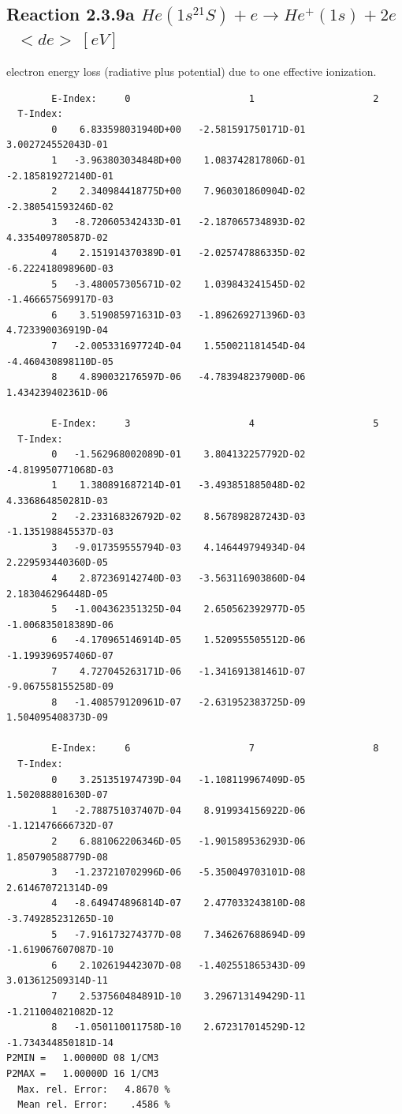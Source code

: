 \documentclass[12pt,dvipdfmx]{article}
\begin{document}
\subsection{
  Reaction 2.3.9a  $He(1s^21S) + e \rightarrow He^+(1s) + 2e $  \ $ <de> \ [eV] $
}

  electron energy loss (radiative plus potential) due to one effective ionization.

\begin{small}\begin{verbatim}
        E-Index:     0                     1                     2
  T-Index:
        0    6.833598031940D+00   -2.581591750171D-01    3.002724552043D-01
        1   -3.963803034848D+00    1.083742817806D-01   -2.185819272140D-01
        2    2.340984418775D+00    7.960301860904D-02   -2.380541593246D-02
        3   -8.720605342433D-01   -2.187065734893D-02    4.335409780587D-02
        4    2.151914370389D-01   -2.025747886335D-02   -6.222418098960D-03
        5   -3.480057305671D-02    1.039843241545D-02   -1.466657569917D-03
        6    3.519085971631D-03   -1.896269271396D-03    4.723390036919D-04
        7   -2.005331697724D-04    1.550021181454D-04   -4.460430898110D-05
        8    4.890032176597D-06   -4.783948237900D-06    1.434239402361D-06

        E-Index:     3                     4                     5
  T-Index:
        0   -1.562968002089D-01    3.804132257792D-02   -4.819950771068D-03
        1    1.380891687214D-01   -3.493851885048D-02    4.336864850281D-03
        2   -2.233168326792D-02    8.567898287243D-03   -1.135198845537D-03
        3   -9.017359555794D-03    4.146449794934D-04    2.229593440360D-05
        4    2.872369142740D-03   -3.563116903860D-04    2.183046296448D-05
        5   -1.004362351325D-04    2.650562392977D-05   -1.006835018389D-06
        6   -4.170965146914D-05    1.520955505512D-06   -1.199396957406D-07
        7    4.727045263171D-06   -1.341691381461D-07   -9.067558155258D-09
        8   -1.408579120961D-07   -2.631952383725D-09    1.504095408373D-09

        E-Index:     6                     7                     8
  T-Index:
        0    3.251351974739D-04   -1.108119967409D-05    1.502088801630D-07
        1   -2.788751037407D-04    8.919934156922D-06   -1.121476666732D-07
        2    6.881062206346D-05   -1.901589536293D-06    1.850790588779D-08
        3   -1.237210702996D-06   -5.350049703101D-08    2.614670721314D-09
        4   -8.649474896814D-07    2.477033243810D-08   -3.749285231265D-10
        5   -7.916173274377D-08    7.346267688694D-09   -1.619067607087D-10
        6    2.102619442307D-08   -1.402551865343D-09    3.013612509314D-11
        7    2.537560484891D-10    3.296713149429D-11   -1.211004021082D-12
        8   -1.050110011758D-10    2.672317014529D-12   -1.734344850181D-14
P2MIN =   1.00000D 08 1/CM3
P2MAX =   1.00000D 16 1/CM3
  Max. rel. Error:   4.8670 %
  Mean rel. Error:    .4586 %

\end{verbatim}\end{small}
\end{document}
